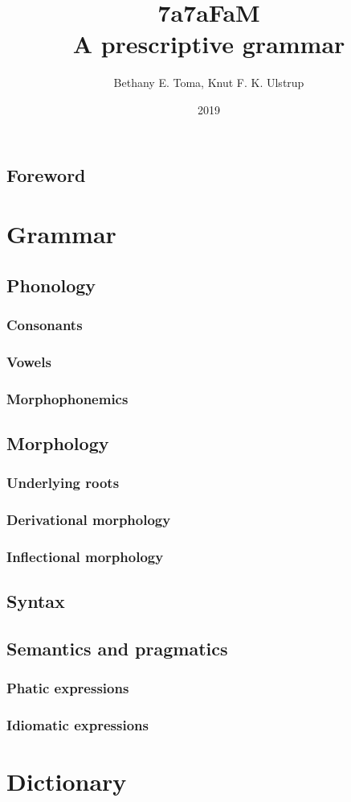 \documentclass[a4paper,10pt,twoside,openright,draft]{memoir}
\title{7a7aFaM \\ A prescriptive grammar}
\author{Bethany E. Toma, Knut F. K. Ulstrup}
\date{2019}
\begin{document}
\maketitle

\frontmatter

\chapter{Foreword}

\tableofcontents

\mainmatter

\part{Grammar}

\chapter{Phonology}
\section{Consonants}
\section{Vowels}
\section{Morphophonemics}

\chapter{Morphology}
\section{Underlying roots}
\section{Derivational morphology}
\section{Inflectional morphology}

\chapter{Syntax}

\chapter{Semantics and pragmatics}
\section{Phatic expressions}
\section{Idiomatic expressions}

\part{Dictionary}
\end{document}

